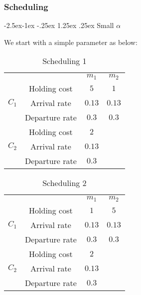 \documentclass[
  a4paper, xcolor = usenames,dvipsnames]{article}
\makeatletter
\renewcommand\paragraph{\@startsection{paragraph}{4}{\z@}%
  {-2.5ex\@plus -1ex \@minus -.25ex}%
  {1.25ex \@plus .25ex}%
  {\normalfont\normalsize\bfseries}}
\theoremstyle{definition}
\theoremstyle{definition}
\theoremstyle{definition}
\theoremstyle{definition}
\theoremstyle{remark}
\makeatother
\begin{document}
\hypertarget{scheduling-1}{%
\subsubsection{Scheduling}\label{scheduling-1}}

\hypertarget{small-alpha}{%
\paragraph{\texorpdfstring{Small \(\alpha\)}{Small \textbackslash alpha}}\label{small-alpha}}

We start with a simple parameter as below:

\begin{table}[!htbp]
\caption{Scheduling 1}
\begin{center}
\begin{tabular}{c c c c}
    \hline
    \multicolumn{2}{c}{} & $m_{1}$ & $m_{2}$ \\
    \cline{2-4}
    \multirow{3}{*}{$C_{1}$} & Holding cost & $5$ & $1$ \\
    & Arrival rate & $0.13$ & $0.13$ \\
    & Departure rate & $0.3$ & $0.3$ \\
    \cline{2-4}
    \multirow{3}{*}{$C_{2}$} & Holding cost & $2$ & \\
    & Arrival rate & $0.13$ & \\
    & Departure rate & $0.3$ & \\    
    \hline
\end{tabular}
\label{tab:scheduling-1}
\end{center}
\end{table}

\begin{table}[!htbp]
\caption{Scheduling 2}
\begin{center}
\begin{tabular}{c c c c}
    \hline
    \multicolumn{2}{c}{} & $m_{1}$ & $m_{2}$ \\
    \cline{2-4}
    \multirow{3}{*}{$C_{1}$} & Holding cost & $1$ & $5$ \\
    & Arrival rate & $0.13$ & $0.13$ \\
    & Departure rate & $0.3$ & $0.3$ \\
    \cline{2-4}
    \multirow{3}{*}{$C_{2}$} & Holding cost & $2$ & \\
    & Arrival rate & $0.13$ & \\
    & Departure rate & $0.3$ & \\    
    \hline
\end{tabular}
\label{tab:scheduling-2}
\end{center}
\end{table}
\end{document}
